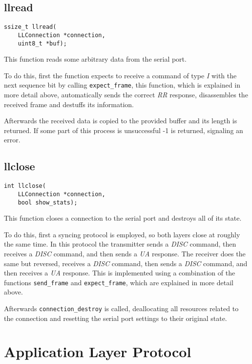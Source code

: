 \documentclass[11pt,a4paper,twocolumn]{article}
\begin{document}
\subsection{llread}

\begin{lstlisting}
ssize_t llread(
    LLConnection *connection, 
    uint8_t *buf);
\end{lstlisting}

This function reads some arbitrary data from the serial port.

To do this, first the function expects to receive a command of type \textit{I} with the next sequence bit by calling \lstinline{expect_frame}, this function, which is explained in more detail above, automatically sends the correct \textit{RR} response, disassembles the received frame and destuffs its information.

Afterwards the received data is copied to the provided buffer and its length is returned.
If some part of this process is unsuccessful -1 is returned, signaling an error.

\subsection{llclose}

\begin{lstlisting}
int llclose(
    LLConnection *connection, 
    bool show_stats);
\end{lstlisting}

This function closes a connection to the serial port and destroys all of its state.

To do this, first a syncing protocol is employed, so both layers close at roughly the same time.
In this protocol the transmitter sends a \textit{DISC} command, then receives a \textit{DISC} command, and then sends a \textit{UA} response.
The receiver does the same but reversed, receives a \textit{DISC} command, then sends a \textit{DISC} command, and then receives a \textit{UA} response.
This is implemented using a combination of the functions \lstinline{send_frame} and \lstinline{expect_frame}, which are explained in more detail above.

Afterwards \lstinline{connection_destroy} is called, deallocating all resources related to the connection and resetting the serial port settings to their original state.

\section{Application Layer Protocol}
\end{document}
